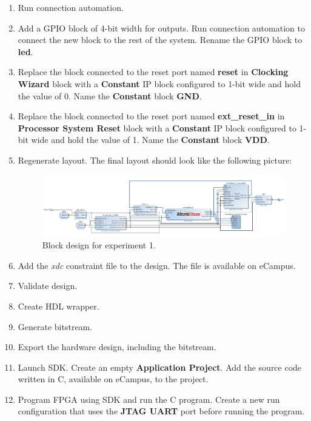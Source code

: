 \documentclass[11pt,letterpaper,titlepage]{article}
\begin{document}
\begin{enumerate}
    \item Run connection automation.
    
    \item Add a GPIO block of 4-bit width for outputs. Run connection automation to connect the new block to the rest of the system. Rename the GPIO block to \textbf{led}.
    
    \item Replace the block connected to the reset port named \textbf{reset} in \textbf{Clocking Wizard} block with a \textbf{Constant} IP block configured to 1-bit wide and hold the value of 0. Name the \textbf{Constant} block \textbf{GND}.
    
    \item Replace the block connected to the reset port named \textbf{ext\_reset\_in} in \textbf{Processor System Reset} block with a \textbf{Constant} IP block configured to 1-bit wide and hold the value of 1. Name the \textbf{Constant} block \textbf{VDD}.
    
    \item Regenerate layout. The final layout should look like the following picture:
    
    \begin{figure}[ht]
    \centering
    \includegraphics[width=\textwidth]{Ex1_layout.png}
    \caption{Block design for experiment 1.}
    \end{figure}
    
    \item Add the \textit{xdc} constraint file to the design. The file is available on eCampus.
    
    \item Validate design. 
    
    \item Create HDL wrapper. 
    
    \item Generate bitstream.
    
    \item Export the hardware design, including the bitstream.
    
    \item Launch SDK. Create an empty \textbf{Application Project}. Add the source code written in C, available on eCampus, to the project.
    
    \item Program FPGA using SDK and run the C program. Create a new run configuration that uses the \textbf{JTAG UART} port before running the program.
 
\end{enumerate}
\end{document}
